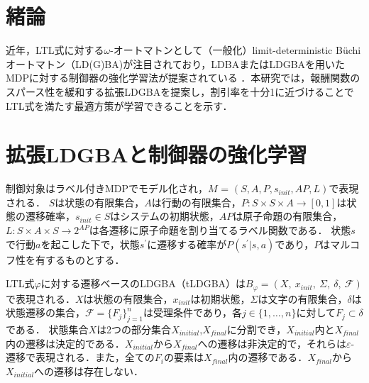 \documentclass[a4j,9pt,twocolumn]{jsarticle}
\theoremstyle{definition}
\begin{document}

\section{緒論}
近年，LTL式に対する$\omega$-オートマトンとして（一般化）limit-deterministic B\"{u}chi オートマトン（LD(G)BA)が注目されており，LDBAまたはLDGBAを用いたMDPに対する制御器の強化学習法が提案されている \cite{HAK2019,Hahn2019}．本研究では，報酬関数のスパース性を緩和する拡張LDGBAを提案し，割引率を十分1に近づけることでLTL式を満たす最適方策が学習できることを示す．

\section{拡張LDGBAと制御器の強化学習}
制御対象はラベル付きMDPでモデル化され，$M$ = $(S, A, P, s_{init}, AP, L)$で表現される．
$S$は状態の有限集合，$A$は行動の有限集合，$P : S \times S \times A \to [0,1]$は状態の遷移確率，$s_{init} \in S$はシステムの初期状態，$AP$は原子命題の有限集合，$L : S \times A \times S \to 2^{AP}$は各遷移に原子命題を割り当てるラベル関数である．
状態$s$で行動$a$を起こした下で，状態$s^{\prime}$に遷移する確率が$P(s^{\prime}|s,a)$であり，$P$はマルコフ性を有するものとする．

LTL式$\varphi$に対する遷移ベースのLDGBA（tLDGBA）は$B_{\varphi}= (X,\ x_{init},\ \Sigma,\ \delta,\ \mathcal{F})$で表現される．$X$は状態の有限集合，$x_{init}$は初期状態，$\Sigma$は文字の有限集合，$\delta$は状態遷移の集合，$\mathcal{F}=\{ F_j \} _{j=1}^{n}$は受理条件であり，各$j\in\{ 1,\ldots,  n \}$に対して$F_j \subset \delta$である．
状態集合$X$は2つの部分集合$X_{initial}$,$X_{final}$に分割でき，$X_{initial}$内と$X_{final}$内の遷移は決定的である．$X_{initial}$から$X_{final}$への遷移は非決定的で，それらは$\varepsilon$-遷移で表現される．また，全ての$F_i$の要素は$X_{final}$内の遷移である．$X_{final}$から$X_{initial}$への遷移は存在しない．
\end{document}
